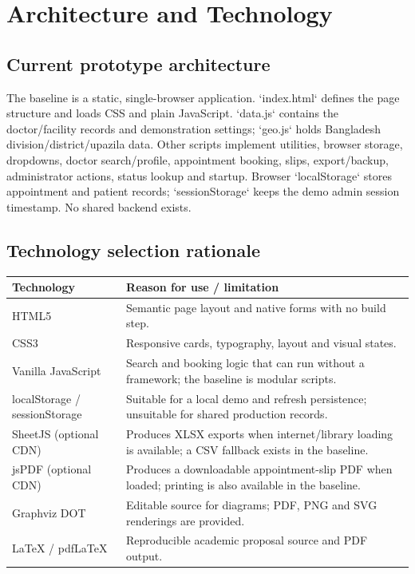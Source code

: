 \documentclass[11pt,a4paper]{article}
\begin{document}
\section{Architecture and Technology}
\subsection{Current prototype architecture}
The baseline is a static, single-browser application. `index.html` defines the page structure and loads CSS and plain JavaScript. `data.js` contains the doctor/facility records and demonstration settings; `geo.js` holds Bangladesh division/district/upazila data. Other scripts implement utilities, browser storage, dropdowns, doctor search/profile, appointment booking, slips, export/backup, administrator actions, status lookup and startup. Browser `localStorage` stores appointment and patient records; `sessionStorage` keeps the demo admin session timestamp. No shared backend exists.

\begin{center}
\end{center}

\subsection{Technology selection rationale}
\begin{tabularx}{\textwidth}{p{3.0cm}X}
\toprule \textbf{Technology} & \textbf{Reason for use / limitation}\\\midrule
HTML5 & Semantic page layout and native forms with no build step.\\
CSS3 & Responsive cards, typography, layout and visual states.\\
Vanilla JavaScript & Search and booking logic that can run without a framework; the baseline is modular scripts.\\
localStorage / sessionStorage & Suitable for a local demo and refresh persistence; unsuitable for shared production records.\\
SheetJS (optional CDN) & Produces XLSX exports when internet/library loading is available; a CSV fallback exists in the baseline.\\
jsPDF (optional CDN) & Produces a downloadable appointment-slip PDF when loaded; printing is also available in the baseline.\\
Graphviz DOT & Editable source for diagrams; PDF, PNG and SVG renderings are provided.\\
LaTeX / pdfLaTeX & Reproducible academic proposal source and PDF output.\\
\bottomrule
\end{tabularx}
\end{document}
